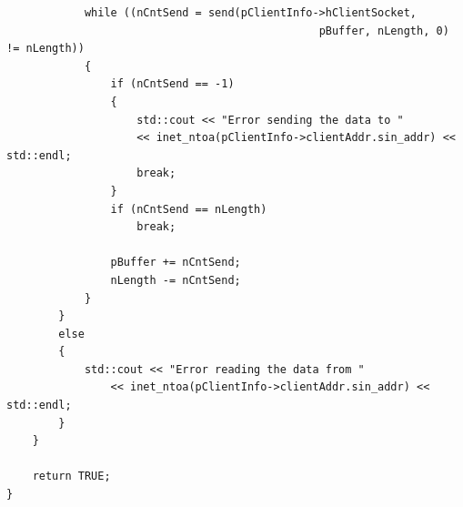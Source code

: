 \documentclass[a4paper,12pt]{article} %
\begin{document}
\begin{verbatim}
            while ((nCntSend = send(pClientInfo->hClientSocket,
                                                pBuffer, nLength, 0) != nLength))
            {
                if (nCntSend == -1)
                {
                    std::cout << "Error sending the data to "
                    << inet_ntoa(pClientInfo->clientAddr.sin_addr) << std::endl;
                    break;
                }
                if (nCntSend == nLength)
                    break;

                pBuffer += nCntSend;
                nLength -= nCntSend;
            }
        }
        else
        {
            std::cout << "Error reading the data from "
                << inet_ntoa(pClientInfo->clientAddr.sin_addr) << std::endl;
        }
    }

    return TRUE;
}
\end{verbatim}

\vspace{3em}
\end{document}
